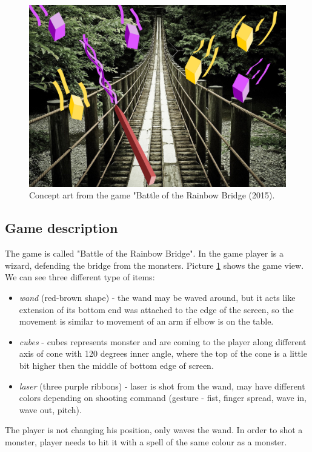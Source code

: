 \documentclass[10pt,a4paper]{article}
\begin{document}
\begin{figure}[ht]
\centering
\includegraphics[width=\textwidth]{drawing.png} 
\caption{Concept art from the game "Battle of the Rainbow Bridge (2015).}
\label{fig:screen}

\end{figure}

\subsection*{Game description}
The game is called "Battle of the Rainbow Bridge". In the game player is a wizard, defending the bridge from the monsters.
Picture \ref{fig:screen} shows the game view. We can see three different type of items:
\begin{itemize}
\item \emph{wand} (red-brown shape) - the wand may be waved around, but it acts like extension of its bottom end was attached to the edge of the screen, so the movement is similar to movement of an arm if elbow is on the table.
\item \emph{cubes} - cubes represents monster and are coming to the player along different axis of cone with 120 degrees inner angle, where the top of the cone is a little bit higher then the middle of bottom edge of screen. 
\item \emph{laser} (three purple ribbons) - laser is shot from the wand, may have different colors depending on shooting command (gesture - fist, finger spread, wave in, wave out, pitch).
\end{itemize}

The player is not changing his position, only waves the wand. In order to shot a monster, player needs to hit it with a spell of the same colour as a monster.
\end{document}
